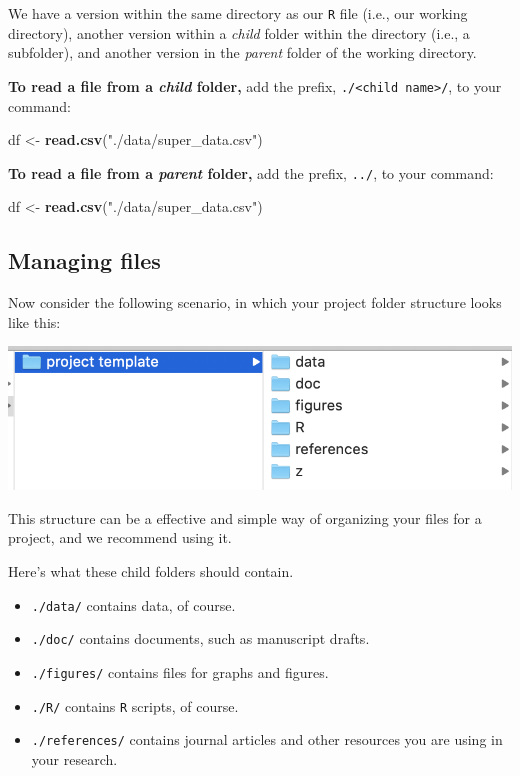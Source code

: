 \documentclass[]{book}
\newenvironment{Shaded}{\begin{snugshade}}{\end{snugshade}}
\newcommand{\KeywordTok}[1]{\textcolor[rgb]{0.13,0.29,0.53}{\textbf{#1}}}
\newcommand{\NormalTok}[1]{#1}
\newcommand{\StringTok}[1]{\textcolor[rgb]{0.31,0.60,0.02}{#1}}
\providecommand{\tightlist}{%
  \setlength{\itemsep}{0pt}\setlength{\parskip}{0pt}}
\begin{document}
We have a version within the same directory as our \texttt{R} file (i.e., our working directory), another version within a \emph{child} folder within the directory (i.e., a subfolder), and another version in the \emph{parent} folder of the working directory.

\textbf{To read a file from a \emph{child} folder,} add the prefix, \texttt{./\textless{}child\ name\textgreater{}/}, to your command:

\begin{Shaded}
\begin{Highlighting}[]
\NormalTok{df <-}\StringTok{ }\KeywordTok{read.csv}\NormalTok{(}\StringTok{"./data/super_data.csv"}\NormalTok{)}
\end{Highlighting}
\end{Shaded}

\textbf{To read a file from a \emph{parent} folder,} add the prefix, \texttt{../}, to your command:

\begin{Shaded}
\begin{Highlighting}[]
\NormalTok{df <-}\StringTok{ }\KeywordTok{read.csv}\NormalTok{(}\StringTok{"./data/super_data.csv"}\NormalTok{)}
\end{Highlighting}
\end{Shaded}

\hypertarget{managing-files}{%
\subsection*{Managing files}\label{managing-files}}

Now consider the following scenario, in which your project folder structure looks like this:

\includegraphics{img/project_template.png}

This structure can be a effective and simple way of organizing your files for a project, and we recommend using it.

Here's what these child folders should contain.

\begin{itemize}
\tightlist
\item
  \texttt{./data/} contains data, of course.
\item
  \texttt{./doc/} contains documents, such as manuscript drafts.
\item
  \texttt{./figures/} contains files for graphs and figures.
\item
  \texttt{./R/} contains \texttt{R} scripts, of course.
\item
  \texttt{./references/} contains journal articles and other resources you are using in your research.
\end{itemize}
\end{document}
